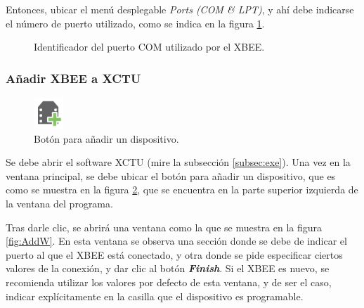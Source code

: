Entonces, ubicar el menú desplegable \textit{Ports (COM \& LPT)}, y ahí debe indicarse el número de puerto utilizado, como se indica en la figura \ref{fig:IdCom}.

\begin{figure}[H] %
\caption[1]{Identificador del puerto COM utilizado por el XBEE.}
\label{fig:IdCom}
\end{figure}

\subsubsection{Añadir XBEE a XCTU}

\begin{figure} %
    \centering
    \includegraphics[width=0.10\textwidth]{Figures/XCTU/AddDeviceButton}
    \caption[1]{Botón para añadir un dispositivo.}
    \label{fig:AddDevice}
\end{figure}

Se debe abrir el software XCTU (mire la subsección \ref{subsec:exe}). Una vez en la ventana principal, se debe ubicar el botón para añadir un dispositivo, que es como se muestra en la figura \ref{fig:AddDevice}, que se encuentra en la parte superior izquierda de la ventana del programa.

Tras darle clic, se abrirá una ventana como la que se muestra en la figura \ref{fig:AddW}. En esta ventana se observa una sección donde se debe de indicar el puerto al que el XBEE está conectado, y otra donde se pide especificar ciertos valores de la conexión, y dar clic al botón \textit{\textbf{Finish}}. Si el XBEE es nuevo, se recomienda utilizar los valores por defecto de esta ventana, y de ser el caso, indicar explícitamente en la casilla que el dispositivo es programable.

